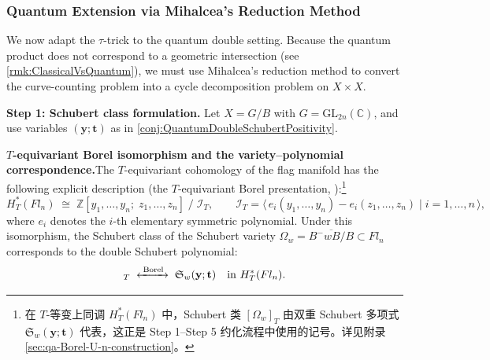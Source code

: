 \bigskip

\subsubsection{Quantum Extension via Mihalcea's Reduction Method}
\label{sec:QuantumReductionFlow}

We now adapt the $\tau$-trick to the quantum double setting. Because the quantum product does not correspond to a geometric intersection (see \cref{rmk:ClassicalVsQuantum}), we must use Mihalcea's reduction method to convert the curve-counting problem into a cycle decomposition problem on $X \times X$.

\medskip
\noindent\textbf{Step 1: Schubert class formulation.} Let $X = G/B$ with $G = \mathrm{GL}_{2n}(\mathbb{C})$, and use variables $(\mathbf{y};\mathbf{t})$ as in \cref{conj:QuantumDoubleSchubertPositivity}.

\medskip
\noindent\textbf{$T$-equivariant Borel isomorphism and the variety--polynomial correspondence.}\quad The $T$-equivariant cohomology of the flag manifold has the following explicit description (the $T$-equivariant Borel presentation, \cite[Theorem 15.6.1]{AndersonFulton}):\footnote{在 $T$-等变上同调 $H_T^*(Fl_n)$ 中，Schubert 类 $[\Omega_w]_T$ 由双重 Schubert 多项式 $\mathfrak{S}_w(\mathbf{y};\mathbf{t})$ 代表，这正是 Step 1--Step 5 约化流程中使用的记号。详见附录 \cref{sec:qa-Borel-U-n-construction}。}
\begin{equation}
H_T^*(Fl_n) \;\cong\; \mathbb{Z}[y_1,\ldots,y_n;\; z_1,\ldots,z_n] \;/\; \mathcal{I}_T,
\qquad
\mathcal{I}_T = \bigl\langle\, e_i(y_1,\ldots,y_n) - e_i(z_1,\ldots,z_n) \;\big|\; i = 1,\ldots,n \,\bigr\rangle,
\label{eq:TBorelIsomorphism}
\end{equation}
where $e_i$ denotes the $i$-th elementary symmetric polynomial. Under this isomorphism, the Schubert class of the Schubert variety $\Omega_w = \overline{B^-wB/B} \subset Fl_n$ corresponds to the double Schubert polynomial:
\begin{equation}
[\Omega_w]_T \;\xleftrightarrow{\;\text{Borel}\;}\; \mathfrak{S}_w(\mathbf{y};\mathbf{t}) \quad \text{in } H_T^*(Fl_n).
\label{eq:DoubleSchubertPolyRep}
\end{equation}

